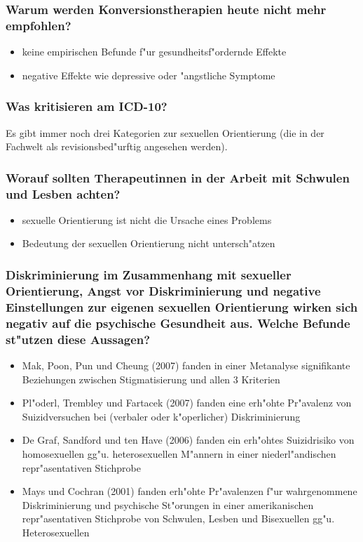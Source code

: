 \subsubsection{Warum werden Konversionstherapien heute nicht mehr empfohlen?}
\begin{itemize}
        \item keine empirischen Befunde f"ur gesundheitsf"ordernde Effekte
        \item negative Effekte wie depressive oder "angstliche Symptome
\end{itemize}

\subsubsection{Was kritisieren \textcite{steffens_diskriminierung_2009} am ICD-10?}
Es gibt immer noch drei Kategorien zur sexuellen Orientierung (die in der Fachwelt als revisionsbed"urftig angesehen werden).

\subsubsection{Worauf sollten Therapeutinnen in der Arbeit mit Schwulen und Lesben achten?}
\begin{itemize}
        \item sexuelle Orientierung ist nicht die Ursache eines Problems
        \item Bedeutung der sexuellen Orientierung nicht untersch"atzen
\end{itemize}

\subsubsection{Diskriminierung im Zusammenhang mit sexueller Orientierung, Angst vor Diskriminierung und negative Einstellungen zur eigenen sexuellen Orientierung wirken sich negativ auf die psychische Gesundheit aus. Welche Befunde st"utzen diese Aussagen?}
\begin{itemize}
        \item Mak, Poon, Pun und Cheung (2007) fanden in einer Metanalyse signifikante Beziehungen zwischen Stigmatisierung und allen 3 Kriterien
        \item Pl"oderl, Trembley und Fartacek (2007) fanden eine erh"ohte Pr"avalenz von Suizidversuchen bei (verbaler oder k"operlicher) Diskriminierung
        \item De Graf, Sandford und ten Have (2006) fanden ein erh"ohtes Suizidrisiko von homosexuellen gg"u. heterosexuellen M"annern in einer niederl"andischen repr"asentativen Stichprobe
        \item Mays und Cochran (2001) fanden erh"ohte Pr"avalenzen f"ur wahrgenommene Diskriminierung und psychische St"orungen in einer amerikanischen repr"asentativen Stichprobe von Schwulen, Lesben und Bisexuellen gg"u. Heterosexuellen
\end{itemize}
